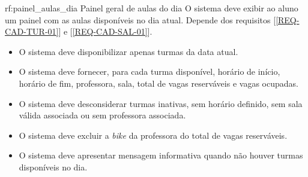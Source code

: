 \reqfunc
{rf:painel_aulas_dia}
{Painel geral de aulas do dia}
{O sistema deve exibir ao aluno um painel com as aulas disponíveis no dia atual.}
{Depende dos requisitos [\ref{REQ-CAD-TUR-01}] e [\ref{REQ-CAD-SAL-01}].}
{\begin{itemize}[leftmargin=0.6cm]
    \item O sistema deve disponibilizar apenas turmas da data atual.
    \item O sistema deve fornecer, para cada turma disponível, horário de início, horário de fim, professora, sala, total de vagas reserváveis e vagas ocupadas.
    \item O sistema deve desconsiderar turmas inativas, sem horário definido, sem sala válida associada ou sem professora associada.
    \item O sistema deve excluir a \textit{bike} da professora do total de vagas reserváveis.
    \item O sistema deve apresentar mensagem informativa quando não houver turmas disponíveis no dia.
\end{itemize}}

